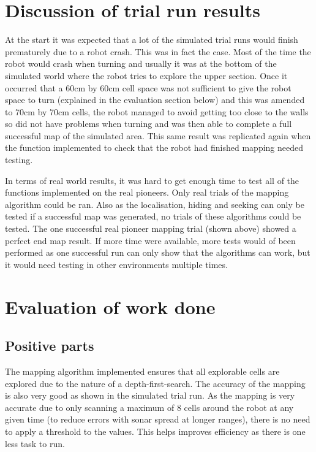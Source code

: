 \documentclass[a4paper,12pt]{article}
\begin{document}
\section{Discussion of trial run results}
\noindent At the start it was expected that a lot of the simulated trial runs would finish prematurely due to a robot crash. This was in fact the case. Most of the time the robot would crash when turning and usually it was at the bottom of the simulated world where the robot tries to explore the upper section. Once it occurred that a 60cm by 60cm cell space was not sufficient to give the robot space to turn (explained in the evaluation section below) and this was amended to 70cm by 70cm cells, the robot managed to avoid getting too close to the walls so did not have problems when turning and was then able to complete a full successful map of the simulated area. This same result was replicated again when the function implemented to check that the robot had finished mapping needed testing.

\vspace{5mm}
\noindent In terms of real world results, it was hard to get enough time to test all of the functions implemented on the real pioneers. Only  real trials of the mapping algorithm could be ran. Also as the localisation, hiding and seeking can only be tested if a successful map was generated, no trials of these algorithms could be tested. The one successful real pioneer mapping trial (shown above) showed a perfect end map result. If more time were available, more tests would of been performed as one successful run can only show that the algorithms can work, but it would need testing in other environments multiple times.

\section{Evaluation of work done}

\subsection{Positive parts}
\noindent The mapping algorithm implemented ensures that all explorable cells are explored due to the nature of a depth-first-search. The accuracy of the mapping is also very good as shown in the simulated trial run. As the mapping is very accurate due to only scanning a maximum of 8 cells around the robot at any given time (to reduce errors with sonar spread at longer ranges), there is no need to apply a threshold to the values. This helps improves efficiency as there is one less task to run.
\end{document}
